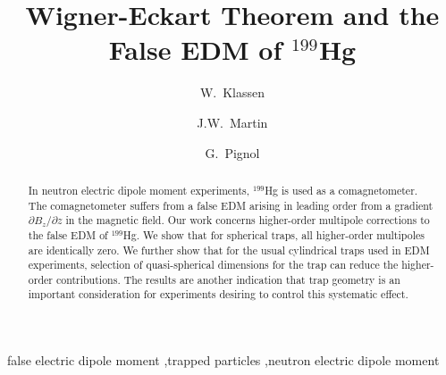 \documentclass[preprint,12pt]{elsarticle}
\begin{document}
\begin{frontmatter}


\title{Wigner-Eckart Theorem and the False EDM of $^{199}$Hg}




\author[um]{W.~Klassen}
\author[uw,um]{J.W.~Martin}
\author[lspc]{G.~Pignol}

\address[um]{Physics and Astronomy, University of Manitoba, Winnipeg, MB, Canada}
\address[uw]{Department of Physics, The University of Winnipeg, Winnipeg, MB, Canada}
\address[lspc]{Universit\'e Grenoble Alpes, CNRS, Grenoble INP, LPSC-IN2P3, Grenoble, France}

\begin{abstract}
  In neutron electric dipole moment experiments, $^{199}$Hg is used as
  a comagnetometer.  The comagnetometer suffers from a false EDM
  arising in leading order from a gradient $\partial B_{z}/\partial z$
  in the magnetic field.  Our work concerns higher-order multipole
  corrections to the false EDM of $^{199}$Hg.  We show that for
  spherical traps, all higher-order multipoles are identically zero.
  We further show that for the usual cylindrical traps used in EDM
  experiments, selection of quasi-spherical dimensions for the trap
  can reduce the higher-order contributions.  The results are another
  indication that trap geometry is an important consideration for
  experiments desiring to control this systematic effect.
\end{abstract}

\begin{keyword}
false electric dipole moment \sep trapped particles \sep neutron electric dipole moment


\end{keyword}

\end{frontmatter}
\end{document}
